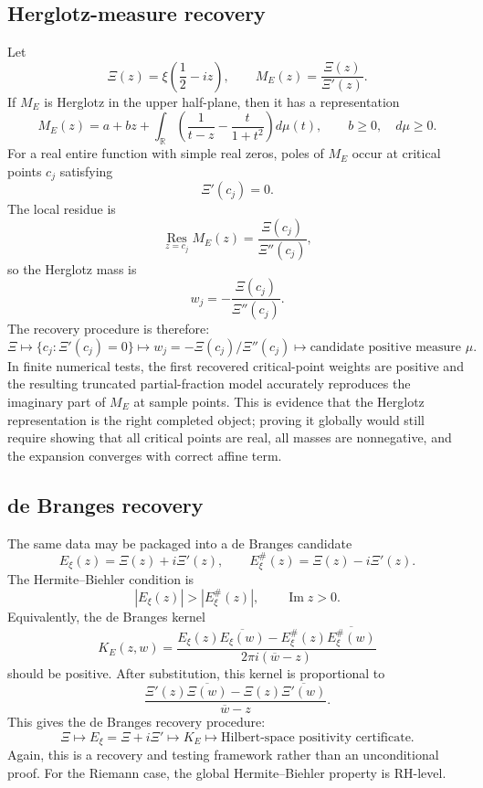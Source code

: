 \documentclass[11pt]{article}
\DeclareMathOperator{\Imm}{Im}
\newcommand{\R}{\mathbb R}
\newcommand{\half}{\frac12}
\begin{document}
\subsection{Herglotz-measure recovery}

Let
\[
        \Xi(z)=\xi\left(\half-iz\right),
        \qquad
        M_E(z)=\frac{\Xi(z)}{\Xi'(z)}.
\]
If $M_E$ is Herglotz in the upper half-plane, then it has a representation
\[
\boxed{
        M_E(z)=a+bz+\int_{\R}\left(\frac1{t-z}-\frac{t}{1+t^2}\right)d\mu(t),
        \qquad b\ge0,\quad d\mu\ge0.
}
\]
For a real entire function with simple real zeros, poles of $M_E$ occur at critical points $c_j$ satisfying
\[
        \Xi'(c_j)=0.
\]
The local residue is
\[
        \operatorname*{Res}_{z=c_j}M_E(z)=\frac{\Xi(c_j)}{\Xi''(c_j)},
\]
so the Herglotz mass is
\[
\boxed{
        w_j=-\frac{\Xi(c_j)}{\Xi''(c_j)}.
}
\]
The recovery procedure is therefore:
\[
\boxed{
        \Xi
        \longmapsto
        \{c_j:\Xi'(c_j)=0\}
        \longmapsto
        w_j=-\Xi(c_j)/\Xi''(c_j)
        \longmapsto
        \text{candidate positive measure }\mu.
}
\]
In finite numerical tests, the first recovered critical-point weights are positive and the resulting truncated partial-fraction model accurately reproduces the imaginary part of $M_E$ at sample points. This is evidence that the Herglotz representation is the right completed object; proving it globally would still require showing that all critical points are real, all masses are nonnegative, and the expansion converges with correct affine term.

\subsection{de Branges recovery}

The same data may be packaged into a de Branges candidate
\[
\boxed{
        E_\xi(z)=\Xi(z)+i\Xi'(z),
        \qquad
        E_\xi^\#(z)=\Xi(z)-i\Xi'(z).
}
\]
The Hermite--Biehler condition is
\[
\boxed{
        |E_\xi(z)|>|E_\xi^\#(z)|,
        \qquad \Imm z>0.
}
\]
Equivalently, the de Branges kernel
\[
\boxed{
        K_E(z,w)=
        \frac{E_\xi(z)\overline{E_\xi(w)}-E_\xi^\#(z)\overline{E_\xi^\#(w)}}
        {2\pi i(\overline w-z)}
}
\]
should be positive. After substitution, this kernel is proportional to
\[
        \frac{\Xi'(z)\overline{\Xi(w)}-\Xi(z)\overline{\Xi'(w)}}{\overline w-z}.
\]
This gives the de Branges recovery procedure:
\[
\boxed{
        \Xi
        \longmapsto
        E_\xi=\Xi+i\Xi'
        \longmapsto
        K_E
        \longmapsto
        \text{Hilbert-space positivity certificate.}
}
\]
Again, this is a recovery and testing framework rather than an unconditional proof. For the Riemann case, the global Hermite--Biehler property is RH-level.
\end{document}
